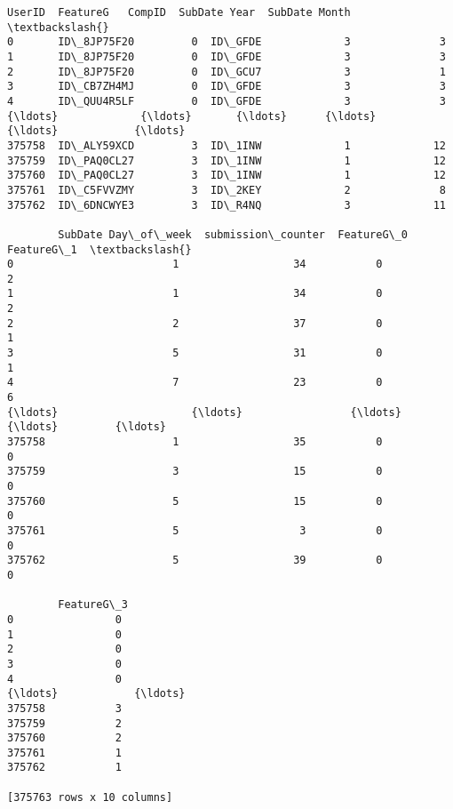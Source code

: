 \documentclass{report}
\makeatletter
\newcommand{\boxspacing}{\kern\kvtcb@left@rule\kern\kvtcb@boxsep}
\newcommand{\prompt}[4]{
        \ttfamily\llap{{\color{#2}[#3]:\hspace{3pt}#4}}\vspace{-\baselineskip}
    }
\makeatother
\begin{document}
            \begin{tcolorbox}[breakable, size=fbox, boxrule=.5pt, pad at break*=1mm, opacityfill=0]
\prompt{Out}{outcolor}{56}{\boxspacing}
\begin{Verbatim}[commandchars=\\\{\}]
             UserID  FeatureG   CompID  SubDate Year  SubDate Month  \textbackslash{}
0       ID\_8JP75F20         0  ID\_GFDE             3              3
1       ID\_8JP75F20         0  ID\_GFDE             3              3
2       ID\_8JP75F20         0  ID\_GCU7             3              1
3       ID\_CB7ZH4MJ         0  ID\_GFDE             3              3
4       ID\_QUU4R5LF         0  ID\_GFDE             3              3
{\ldots}             {\ldots}       {\ldots}      {\ldots}           {\ldots}            {\ldots}
375758  ID\_ALY59XCD         3  ID\_1INW             1             12
375759  ID\_PAQ0CL27         3  ID\_1INW             1             12
375760  ID\_PAQ0CL27         3  ID\_1INW             1             12
375761  ID\_C5FVVZMY         3  ID\_2KEY             2              8
375762  ID\_6DNCWYE3         3  ID\_R4NQ             3             11

        SubDate Day\_of\_week  submission\_counter  FeatureG\_0  FeatureG\_1  \textbackslash{}
0                         1                  34           0           2
1                         1                  34           0           2
2                         2                  37           0           1
3                         5                  31           0           1
4                         7                  23           0           6
{\ldots}                     {\ldots}                 {\ldots}         {\ldots}         {\ldots}
375758                    1                  35           0           0
375759                    3                  15           0           0
375760                    5                  15           0           0
375761                    5                   3           0           0
375762                    5                  39           0           0

        FeatureG\_3
0                0
1                0
2                0
3                0
4                0
{\ldots}            {\ldots}
375758           3
375759           2
375760           2
375761           1
375762           1

[375763 rows x 10 columns]
\end{Verbatim}
\end{tcolorbox}
        
\end{document}
